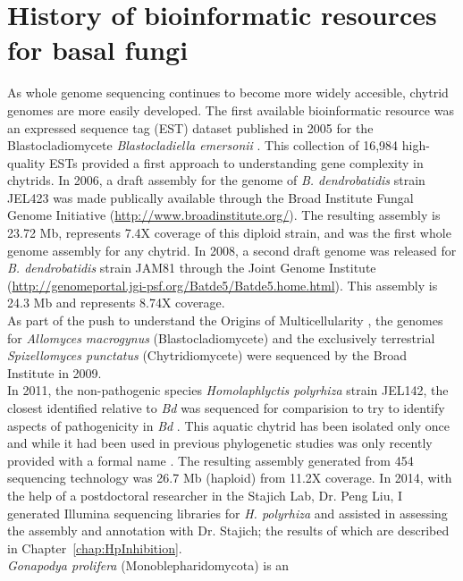 \section{History of bioinformatic resources for basal fungi}
As whole genome sequencing continues to become more widely accesible,
chytrid genomes are more easily developed. The first available
bioinformatic resource was an expressed sequence tag (EST) dataset
published in 2005 for the Blastocladiomycete \textit{Blastocladiella
  emersonii} \cite{Ribichich2005}. This collection of 16,984
high-quality ESTs provided a first approach to understanding gene
complexity in chytrids. In 2006, a draft assembly for the genome of
\textit{B. dendrobatidis} strain JEL423 was made publically available
through the Broad Institute Fungal Genome Initiative
(\url{http://www.broadinstitute.org/}). The resulting assembly is 23.72 Mb,
represents 7.4X coverage of this diploid strain, and was the first
whole genome assembly for any chytrid. In 2008, a second draft genome
was released for \textit{B. dendrobatidis} strain JAM81 through the
Joint Genome Institute
(\url{http://genomeportal.jgi-psf.org/Batde5/Batde5.home.html}). This
assembly is 24.3 Mb and represents 8.74X coverage. \\
\indent As part of the push to understand the Origins of
Multicellularity \cite{RuizTrillo2007}, the genomes for 
\textit{Allomyces macrogynus} (Blastocladiomycete) and 
the exclusively terrestrial \textit{Spizellomyces punctatus} 
(Chytridiomycete) were sequenced by the Broad Institute in 2009. \\
\indent In 2011, the non-pathogenic species \textit{Homolaphlyctis
  polyrhiza} strain JEL142, the closest identified relative to
\textit{Bd} was sequenced for comparision to try to identify aspects
of pathogenicity in \textit{Bd} \cite{Joneson2011}. This aquatic chytrid 
has been isolated only once and while it had been used in previous phylogenetic 
\cite{James2000,James2006sixGene,Letcher2008} studies was only recently provided with a formal name \cite{Longcore2011}. 
The resulting assembly generated from 454 sequencing technology was 26.7 Mb
(haploid) from 11.2X coverage. In 2014, with the help of a postdoctoral researcher in the
Stajich Lab, Dr. Peng Liu, I generated Illumina sequencing libraries
for \textit{H. polyrhiza} and assisted in assessing the assembly and
annotation with Dr. Stajich; the results of which are described in
Chapter~\ref{chap:HpInhibition}.\\
\indent \textit{Gonapodya prolifera} (Monoblepharidomycota) is an
